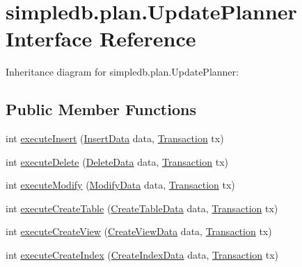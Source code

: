 \hypertarget{interfacesimpledb_1_1plan_1_1UpdatePlanner}{}\section{simpledb.\+plan.\+Update\+Planner Interface Reference}
\label{interfacesimpledb_1_1plan_1_1UpdatePlanner}


Inheritance diagram for simpledb.\+plan.\+Update\+Planner\+:
\subsection*{Public Member Functions}
\begin{DoxyCompactItemize}
\item 
int \hyperlink{interfacesimpledb_1_1plan_1_1UpdatePlanner_a6f2cfe8428b2c5f61204b8606905100e}{execute\+Insert} (\hyperlink{classsimpledb_1_1parse_1_1InsertData}{Insert\+Data} data, \hyperlink{classsimpledb_1_1tx_1_1Transaction}{Transaction} tx)
\item 
int \hyperlink{interfacesimpledb_1_1plan_1_1UpdatePlanner_a7141a96cb092881cc149f0804bbafc20}{execute\+Delete} (\hyperlink{classsimpledb_1_1parse_1_1DeleteData}{Delete\+Data} data, \hyperlink{classsimpledb_1_1tx_1_1Transaction}{Transaction} tx)
\item 
int \hyperlink{interfacesimpledb_1_1plan_1_1UpdatePlanner_af887ff3fe178adb4fc3b3bee98acde73}{execute\+Modify} (\hyperlink{classsimpledb_1_1parse_1_1ModifyData}{Modify\+Data} data, \hyperlink{classsimpledb_1_1tx_1_1Transaction}{Transaction} tx)
\item 
int \hyperlink{interfacesimpledb_1_1plan_1_1UpdatePlanner_a44085c8b895a3da12486d3f59fde4a3a}{execute\+Create\+Table} (\hyperlink{classsimpledb_1_1parse_1_1CreateTableData}{Create\+Table\+Data} data, \hyperlink{classsimpledb_1_1tx_1_1Transaction}{Transaction} tx)
\item 
int \hyperlink{interfacesimpledb_1_1plan_1_1UpdatePlanner_a3f1e2a94b4ca0c9c4090989670fd111a}{execute\+Create\+View} (\hyperlink{classsimpledb_1_1parse_1_1CreateViewData}{Create\+View\+Data} data, \hyperlink{classsimpledb_1_1tx_1_1Transaction}{Transaction} tx)
\item 
int \hyperlink{interfacesimpledb_1_1plan_1_1UpdatePlanner_a62e66672add275bc79b05825186051aa}{execute\+Create\+Index} (\hyperlink{classsimpledb_1_1parse_1_1CreateIndexData}{Create\+Index\+Data} data, \hyperlink{classsimpledb_1_1tx_1_1Transaction}{Transaction} tx)
\end{DoxyCompactItemize}


